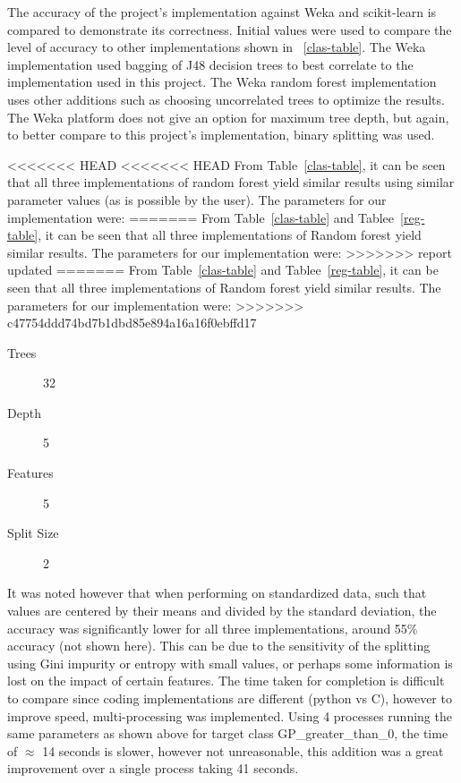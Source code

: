 \documentclass{article} %
\begin{document}
The accuracy of the project’s implementation against Weka and scikit-learn is compared to demonstrate
its correctness.  Initial values were used to compare the level of accuracy to other implementations shown in ~\ref{clas-table}. The Weka implementation used bagging of J48 decision trees to best correlate to the implementation used in this project. The Weka random forest implementation uses other additions such as choosing uncorrelated trees to optimize the results. The Weka platform does not give an option for maximum tree depth, but again, to better compare to this project's implementation, binary splitting was used.

<<<<<<< HEAD
<<<<<<< HEAD
From Table~\ref{clas-table}, it can be seen that all three implementations of random forest yield similar results using similar parameter values (as is possible by the user). The parameters for our implementation were:
=======
From Table~\ref{clas-table} and Tablee~\ref{reg-table}, it can be seen that all three implementations of Random forest yield similar results. The parameters for our implementation were:
>>>>>>> report updated
=======
From Table~\ref{clas-table} and Tablee~\ref{reg-table}, it can be seen that all three implementations of Random forest yield similar results. The parameters for our implementation were:
>>>>>>> c47754ddd74bd7b1dbd85e894a16a16f0ebffd17
\begin{description}
\item [Trees] 32
\item [Depth] 5
\item [Features] 5
\item [Split Size] 2
\end{description}

It was noted however that when performing on standardized data, such that values are centered by their means and divided by the standard deviation, the accuracy was significantly lower for all three implementations, around 55\% accuracy (not shown here). This can be due to the sensitivity of the splitting using Gini impurity or entropy with small values, or perhaps some information is lost on the impact of certain features. The time taken for completion is difficult to compare since coding implementations are different (python vs C), however to improve speed, multi-processing was implemented. Using 4 processes running the same parameters as shown above for target class GP\_greater\_than\_0, the time of $\approx$ 14 seconds is slower, however not unreasonable, this addition was a great improvement over a single process taking 41 seconds.
\end{document}
